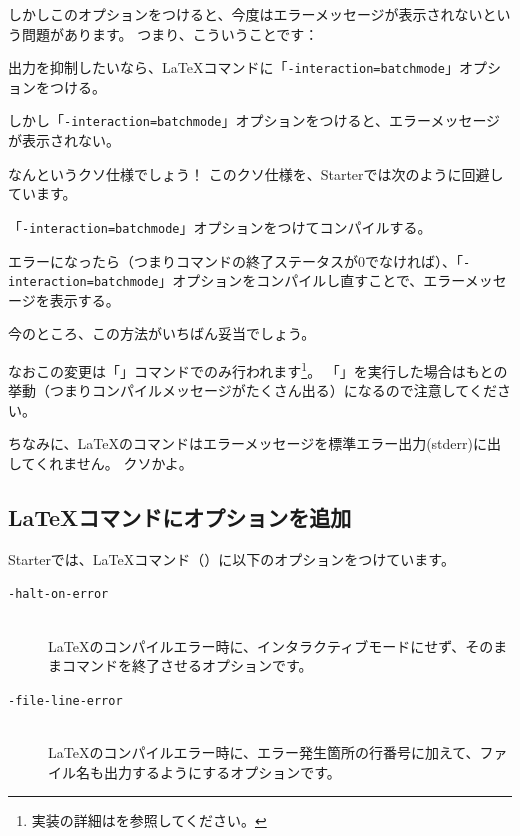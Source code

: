 しかしこのオプションをつけると、今度はエラーメッセージが表示されないという問題があります。
つまり、こういうことです：

\begin{starteritemize}
\item 出力を抑制したいなら、\LaTeX{}コマンドに「\texttt{{-}interaction=batchmode}」オプションをつける。
\item しかし「\texttt{{-}interaction=batchmode}」オプションをつけると、エラーメッセージが表示されない。
\end{starteritemize}

なんというクソ仕様でしょう！
このクソ仕様を、Starterでは次のように回避しています。

\begin{starterenumerate}
\item 「\texttt{{-}interaction=batchmode}」オプションをつけてコンパイルする。
\item エラーになったら（つまりコマンドの終了ステータスが0でなければ）、「\texttt{{-}interaction=batchmode}」オプションをコンパイルし直すことで、エラーメッセージを表示する。
\end{starterenumerate}

今のところ、この方法がいちばん妥当でしょう。

なおこの変更は「」コマンドでのみ行われます\footnote{実装の詳細はを参照してください。}。
「」を実行した場合はもとの挙動（つまりコンパイルメッセージがたくさん出る）になるので注意してください。

ちなみに、\LaTeX{}のコマンドはエラーメッセージを標準エラー出力(stderr)に出してくれません。
クソかよ。

\subsection*{\LaTeX{}コマンドにオプションを追加}
\label{sec:1-3-5}

Starterでは、\LaTeX{}コマンド（）に以下のオプションをつけています。

\begin{description}
\item[\texttt{{-}halt{-}on{-}error}] \mbox{} \\
\LaTeX{}のコンパイルエラー時に、インタラクティブモードにせず、そのままコマンドを終了させるオプションです。
\item[\texttt{{-}file{-}line{-}error}] \mbox{} \\
\LaTeX{}のコンパイルエラー時に、エラー発生箇所の行番号に加えて、ファイル名も出力するようにするオプションです。
\end{description}

